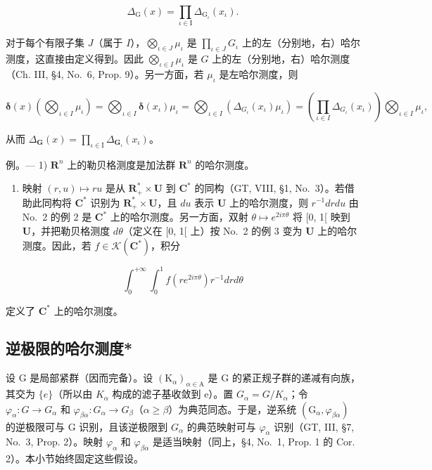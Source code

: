 \[
\Delta_ {\mathrm{G}} (x) = \prod_ {\iota \in \mathrm{I}} \Delta_ {\mathrm{G} _ {\iota}} (x _ {\iota}).
\]

对于每个有限子集 \(J\)（属于 \(I\)），\(\bigotimes_{\iota \in J} \mu_{\iota}\) 是 \(\prod_{\iota \in J} G_{\iota}\) 上的左（分别地，右）哈尔测度，这直接由定义得到。因此 \(\bigotimes_{\iota \in I} \mu_{\iota}\) 是 \(G\) 上的左（分别地，右）哈尔测度（Ch. III, §4, No.~6, Prop. 9）。另一方面，若 \(\mu_{\iota}\) 是左哈尔测度，则

\[
\boldsymbol {\delta} (x) \left(\bigotimes_ {\iota \in I} \mu_ {\iota}\right) = \bigotimes_ {\iota \in I} \boldsymbol {\delta} \left(x _ {\iota}\right) \mu_ {\iota} = \bigotimes_ {\iota \in I} \left(\Delta_ {G _ {\iota}} \left(x _ {\iota}\right) \mu_ {\iota}\right) = \left(\prod_ {\iota \in I} \Delta_ {G _ {\iota}} \left(x _ {\iota}\right)\right) \bigotimes_ {\iota \in I} \mu_ {\iota},
\]

从而 \(\Delta_{\mathbf{G}}(x) = \prod_{\iota \in \mathrm{I}}\Delta_{\mathbf{G}_{\iota}}(x_{\iota})\)。

例。--- 1) \(\mathbf{R}^n\) 上的勒贝格测度是加法群 \(\mathbf{R}^n\) 的哈尔测度。

\begin{enumerate}
\def\labelenumi{\arabic{enumi})}
\setcounter{enumi}{1}
\tightlist
\item
  映射 \((r, u) \mapsto ru\) 是从 \(\mathbf{R}_+^* \times \mathbf{U}\) 到 \(\mathbf{C}^*\) 的同构（GT, VIII, §1, No.~3）。若借助此同构将 \(\mathbf{C}^*\) 识别为 \(\mathbf{R}_+^* \times \mathbf{U}\)，且 \(du\) 表示 \(\mathbf{U}\) 上的哈尔测度，则 \(r^{-1} dr du\) 由 No.~2 的例 2 是 \(\mathbf{C}^*\) 上的哈尔测度。另一方面，双射 \(\theta \mapsto e^{2i\pi\theta}\) 将 {[}0, 1{[} 映到 \(\mathbf{U}\)，并把勒贝格测度 \(d\theta\)（定义在 {[}0, 1{[} 上）按 No.~2 的例 3 变为 \(\mathbf{U}\) 上的哈尔测度。因此，若 \(f \in \mathcal{K}(\mathbf{C}^*)\)，积分
\end{enumerate}

\[
\int_ {0} ^ {+ \infty} \int_ {0} ^ {1} f (r e ^ {2 i \pi \theta}) r ^ {- 1} d r d \theta
\]

定义了 \(\mathbf{C}^*\) 上的哈尔测度。

\subsection{逆极限的哈尔测度*}

设 G 是局部紧群（因而完备）。设 \((\mathrm{K}_{\alpha})_{\alpha\in\mathrm{A}}\) 是 G 的紧正规子群的递减有向族，其交为 \(\{e\}\)（所以由 \(K_{\alpha}\) 构成的滤子基收敛到 e）。置 \(G_{\alpha}=G/K_{\alpha}\)；令 \(\varphi_{\alpha}:G\to G_{\alpha}\) 和 \(\varphi_{\beta\alpha}:G_{\alpha}\to G_{\beta}\)（\(\alpha\geqslant\beta\)）为典范同态。于是，逆系统 \((\mathrm{G}_{\alpha},\varphi_{\beta\alpha})\) 的逆极限可与 G 识别，且该逆极限到 \(G_{\alpha}\) 的典范映射可与 \(\varphi_{\alpha}\) 识别（GT, III, §7, No.~3, Prop. 2）。映射 \(\varphi_{\alpha}\) 和 \(\varphi_{\beta\alpha}\) 是适当映射（同上，§4, No.~1, Prop. 1 的 Cor. 2）。本小节始终固定这些假设。

